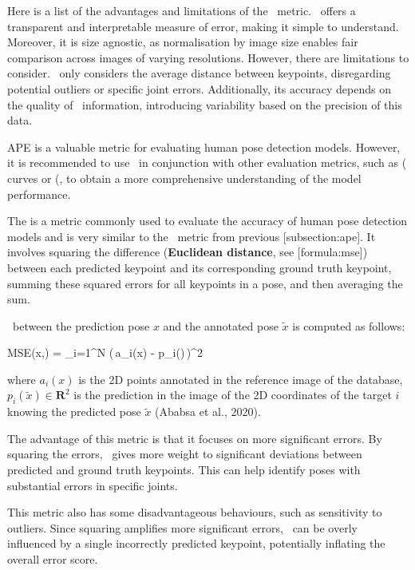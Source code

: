 Here is a list of the advantages and limitations of the \APE\ metric. \APE\ offers a transparent and interpretable measure of error, making it simple to understand. Moreover, it is size agnostic, as normalisation by image size enables fair comparison across images of varying resolutions. However, there are limitations to consider. \APE\ only considers the average distance between keypoints, disregarding potential outliers or specific joint errors. Additionally, its accuracy depends on the quality of \BBOX\ information, introducing variability based on the precision of this data.

APE is a valuable metric for evaluating human pose detection models. However, it is recommended to use \APE\ in conjunction with other evaluation metrics, such as  (\PR\) curves or  (\OKS\), to obtain a more comprehensive understanding of the model performance.

The \pojem{\MSE} is a metric commonly used to evaluate the accuracy of human pose detection models and is very similar to the \APE\ metric from previous [subsection:ape]. It involves squaring the difference ({\bf Euclidean distance}, see [formula:mse]) between each predicted keypoint and its corresponding ground truth keypoint, summing these squared errors for all keypoints in a pose, and then averaging the sum.

\MSE\ between the prediction pose $ x $ and the annotated pose $ \tilde{x}$ is computed as follows:

\startplaceformula[reference=formula:mse]
 \startformula MSE(x,) =  \sum_{i=1}^{N} (\,a_i(x) - p_i()\,)^{2}
 \stopformula
\stopplaceformula

where $ a_i (x) $ is the 2D points annotated in the reference image of the database, $ p_i (\tilde{x}) \in \mathbf R^2 $ is the prediction in the image of the 2D coordinates of the target $ i $ knowing the predicted pose $ \tilde{x} $ (\scc Ababsa et al., 2020).

The advantage of this metric is that it focuses on more significant errors. By squaring the errors, \MSE\ gives more weight to significant deviations between predicted and ground truth keypoints. This can help identify poses with substantial errors in specific joints.

This metric also has some disadvantageous behaviours, such as sensitivity to outliers. Since squaring amplifies more significant errors, \MSE\ can be overly influenced by a single incorrectly predicted keypoint, potentially inflating the overall error score.

